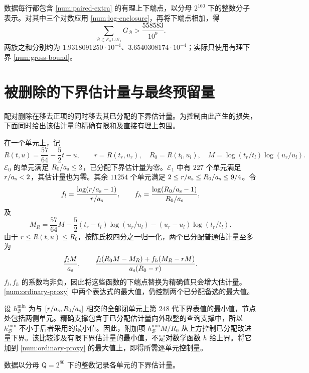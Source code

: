 数据每行都包含 \eqref{num:paired-extra} 的有理上下端点，以分母 $2^{160}$ 下的整数分子表示。对其中三个对数应用 \eqref{num:log-enclosure}，再将下端点相加，得
\begin{equation}
 \sum_{\mathscr B\in \mathscr E_0\cup \mathscr E_1}G_{\mathscr B}>\frac{558583}{10^9}.
 \label{num:gross-bound}
\end{equation}
两族之和分别约为 $1.9318091250\cdot10^{-4}$、$3.6540308174\cdot10^{-4}$；实际只使用有理下界 \eqref{num:gross-bound}。

\section{被删除的下界估计量与最终预留量}
\label{app:refinement-review}

配对删除在移去正项的同时移去其已分配的下界估计量。为控制由此产生的损失，下面同时给出该估计量的精确有限和及直接有理上包围。

在一个单元上，记
\[
 R(t,u)=\frac{57}{64}-\frac52t-u,\qquad
 r=R(t_r,u_r),\quad R_0=R(t_l,u_l),\quad
 M=\log(t_r/t_l)\log(u_r/u_l).
\]
$\mathscr E_0$ 的单元满足 $R_0/{a_{\rm s}}\le2$，已分配下界估计量为零。$\mathscr E_1$ 中有 $227$ 个单元满足 $r/{a_{\rm s}}<2$，其估计量也为零。其余 $11254$ 个单元满足 $2\le r/{a_{\rm s}}\le R_0/{a_{\rm s}}\le9/4$。令
\[
 f_l=\frac{\log(r/{a_{\rm s}}-1)}{r/{a_{\rm s}}},\qquad
 f_h=\frac{\log(R_0/{a_{\rm s}}-1)}{R_0/{a_{\rm s}}},
\]
及
\[
 M_R=\frac{57}{64}M
 -\frac52(t_r-t_l)\log(u_r/u_l)
 -(u_r-u_l)\log(t_r/t_l).
\]
由于 $r\le R(t,u)\le R_0$，按陈氏权四分之一归一化，两个已分配普通估计量至多为
\begin{equation}
 \frac{f_lM}{{a_{\rm s}}},\qquad
 \frac{f_l(R_0M-M_R)+f_h(M_R-rM)}{a_{\rm s}(R_0-r)}.
 \label{num:ordinary-proxy}
\end{equation}
$f_l,f_h$ 的系数均非负，因此将这些函数的下端点替换为精确值只会增大估计量。\eqref{num:ordinary-proxy} 中两个表达式的最大值，仍控制两个已分配备选的最大值。

设 $h_{\mathscr B}^{\min}$ 为与 $[r/{a_{\rm s}},R_0/{a_{\rm s}}]$ 相交的全部闭单元上第 $248$ 代下界表值的最小值，节点处包括两侧单元。精确支撑包含于已分配估计量向外取整的查询支撑中，所以 $h_{\mathscr B}^{\min}$ 不小于后者采用的最小值。因此，附加项 $h_{\mathscr B}^{\min}M/R_0$ 从上方控制已分配改进量下界。该比较涉及有限下界估计量的最小值，不是对数学函数 $h$ 给上界。将它加到 \eqref{num:ordinary-proxy} 的最大值上，即得所需逐单元控制量。

数据以分母 $\mathsf Q=2^{80}$ 下的整数记录各单元的下界估计量。

